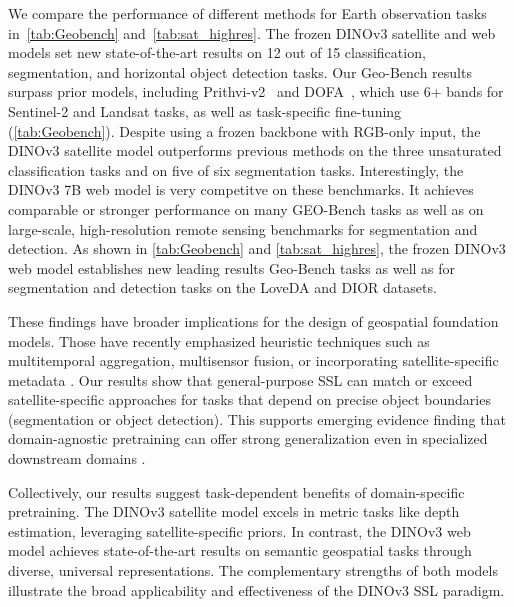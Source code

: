 We compare the performance of different methods for Earth observation tasks in~\cref{tab:Geobench} and~\cref{tab:sat_highres}.
The frozen DINOv3 satellite and web models set new state-of-the-art results on 12 out of 15 classification, segmentation, and horizontal object detection tasks. Our Geo-Bench results surpass prior models, including Prithvi-v2~\citep{szwarcman2024prithvi} and DOFA~\citep{xiong2024neural}, which use 6+ bands for Sentinel-2 and Landsat tasks, as well as task-specific fine-tuning (\cref{tab:Geobench}).
Despite using a frozen backbone with RGB-only input, the DINOv3 satellite model outperforms previous methods on the three unsaturated classification tasks and on five of six segmentation tasks. Interestingly, the DINOv3 7B web model is very competitve on these benchmarks.
It achieves comparable or stronger performance on many GEO-Bench tasks as well as on large-scale, high-resolution remote sensing benchmarks for segmentation and detection.
As shown in \cref{tab:Geobench} and \cref{tab:sat_highres}, the frozen DINOv3 web model establishes new leading results Geo-Bench tasks as well as for segmentation and detection tasks on the LoveDA and DIOR datasets. 












These findings have broader implications for the design of geospatial foundation models.
Those have recently emphasized heuristic techniques such as multitemporal aggregation, multisensor fusion, or incorporating satellite-specific metadata \citep{brown2025alphaearthfoundationsembeddingfield, feng2025tesseratemporalembeddingssurface}.
Our results show that general-purpose SSL can match or exceed satellite-specific approaches for tasks that depend on precise object boundaries (segmentation or object detection). 
This supports emerging evidence finding that domain-agnostic pretraining can offer strong generalization even in specialized downstream domains \citep{lahrichi2025selfsupervisedpretrainingsatelliteimagery}.  

Collectively, our results suggest task-dependent benefits of domain-specific pretraining.
The DINOv3 satellite model excels in metric tasks like depth estimation, leveraging satellite-specific priors.
In contrast, the DINOv3 web model achieves state-of-the-art results on semantic geospatial tasks through diverse, universal representations.
The complementary strengths of both models illustrate the broad applicability and effectiveness of the DINOv3 SSL paradigm. %


